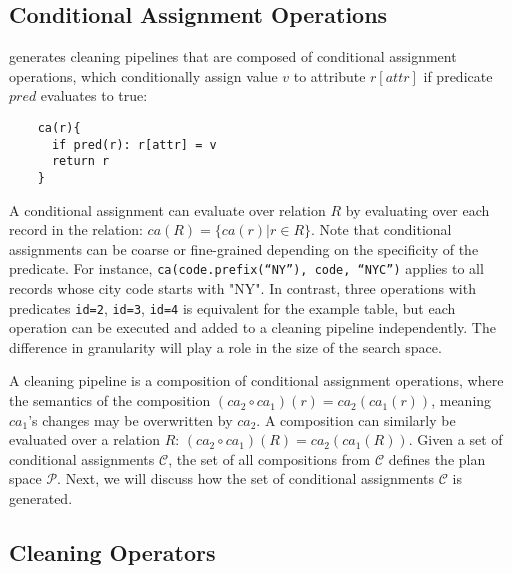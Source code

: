 \subsection{Conditional Assignment Operations}
\sys generates cleaning pipelines that are composed of conditional assignment operations, which conditionally assign value $v$ to attribute $r[attr]$ if predicate $pred$ evaluates to true:
{\small\begin{verbatim}
    ca(r){
      if pred(r): r[attr] = v 
      return r
    }
\end{verbatim}
}
\noindent A conditional assignment can evaluate over relation $R$ by evaluating over each record in the relation:  $ca(R) = \{ca(r) | r \in R\}$.   Note that conditional assignments can be coarse or fine-grained depending on the specificity of the predicate.  For instance, \texttt{ca(code.prefix(``NY''), code, ``NYC'')} applies to all records whose city code starts with "NY".  In contrast, three operations with predicates  \texttt{id=2}, \texttt{id=3}, \texttt{id=4} is equivalent for the example table, but each operation can be executed and added to a cleaning pipeline independently.  The difference in granularity will play a role in the size of the search space.


A cleaning pipeline is a composition of conditional assignment operations, where the semantics of the composition $(ca_2 \circ ca_1)(r) = ca_2(ca_1(r))$, meaning $ca_1$'s changes may be overwritten by $ca_2$.  A composition can similarly be evaluated over a relation $R$: $(ca_2\circ ca_1)(R) = ca_2(ca_1(R))$.    Given a set of conditional assignments $\mathcal{C}$, the set of all compositions from $\mathcal{C}$ defines the plan space $\mathcal{P}$.   Next, we will discuss how the set of conditional assignments $\mathcal{C}$ is generated.


\subsection{Cleaning Operators}


